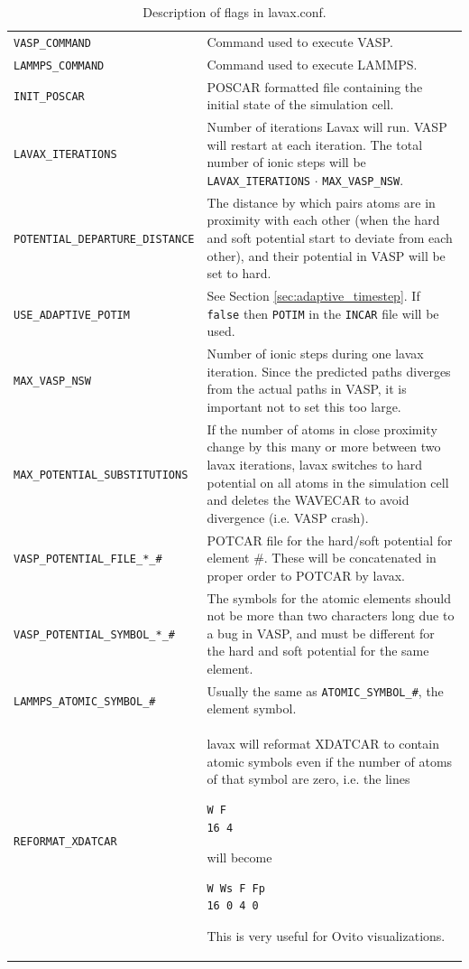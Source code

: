 \documentclass{article}
\begin{document}
\begin{table}[H]
\centering
\caption{Description of flags in lavax.conf.\label{tab:1}}
\begin{tabular}{lp{10cm}}
  \rowcolor{gray!25}
  \hline
  \texttt{VASP\_COMMAND} & Command used to execute VASP. \\
  \texttt{LAMMPS\_COMMAND} & Command used to execute LAMMPS. \\
  \texttt{INIT\_POSCAR} & POSCAR formatted file containing the initial state of the simulation cell. \\
  \texttt{LAVAX\_ITERATIONS} & Number of iterations Lavax will run. VASP will restart at each iteration. The total number of ionic steps will be \texttt{LAVAX\_ITERATIONS} $\cdot$ \texttt{MAX\_VASP\_NSW}. \\
  \texttt{POTENTIAL\_DEPARTURE\_DISTANCE} & The distance by which pairs atoms are in proximity with each other (when the hard and soft potential start to deviate from each other), and their potential in VASP will be set to hard. \\
  \texttt{USE\_ADAPTIVE\_POTIM} & See Section \ref{sec:adaptive_timestep}. If \texttt{false} then \texttt{POTIM} in the \texttt{INCAR} file will be used.\\
  \texttt{MAX\_VASP\_NSW} & Number of ionic steps during one lavax iteration. Since the predicted paths diverges from the actual paths in VASP, it is important not to set this too large. \\
  \texttt{MAX\_POTENTIAL\_SUBSTITUTIONS} & If the number of atoms in close proximity change by this many or more between two lavax iterations, lavax switches to hard potential on all atoms in the simulation cell and deletes the WAVECAR to avoid divergence (i.e. VASP crash). \\
  \texttt{VASP\_POTENTIAL\_FILE\_*\_\#} & POTCAR file for the hard/soft potential for element \#. These will be concatenated in proper order to POTCAR by lavax.\\
  \texttt{VASP\_POTENTIAL\_SYMBOL\_*\_\#} & The symbols for the atomic elements should not be more than two characters long due to a bug in VASP, and must be different for the hard and soft potential for the same element. \\
  \texttt{LAMMPS\_ATOMIC\_SYMBOL\_\#} & Usually the same as \texttt{ATOMIC\_SYMBOL\_\#}, the element symbol.\\
  \texttt{REFORMAT\_XDATCAR} & lavax will reformat XDATCAR to contain atomic symbols even if the number of atoms of that symbol are zero, i.e. the lines
\begin{verbatim}
W F
16 4
\end{verbatim}
will become
\begin{verbatim}
W Ws F Fp
16 0 4 0
\end{verbatim}
This is very useful for Ovito visualizations.\\
  \hline
\end{tabular}
\end{table}
\end{document}
